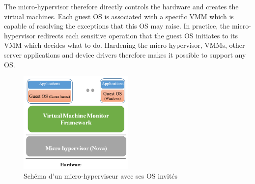 The micro-hypervisor therefore directly controls the hardware and creates the virtual machines. Each guest OS is associated with a specific VMM which is capable of resolving the exceptions that this OS may raise. In practice, the micro-hypervisor redirects each sensitive operation that the guest OS initiates to its VMM which decides what to do. Hardening the micro-hypervisor, VMMs, other server applications and device drivers therefore makes it possible to support any OS.

\begin{figure}[h]
	\centering
	\includegraphics[width=0.5\textwidth]{image/micro_hypervisor}
	\caption{Schéma d'un micro-hyperviseur avec ses OS invités}
	\label{fig:micro_hypervisor}
\end{figure}